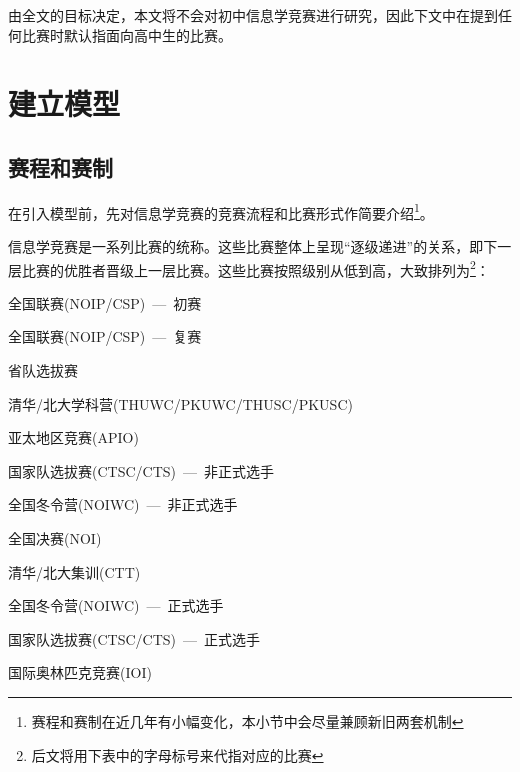     由全文的目标决定，本文将不会对初中信息学竞赛进行研究，因此下文中在提到任何比赛时默认指面向高中生的比赛。

\section{建立模型}\label{sec:sec2Modeling}

    \subsection{赛程和赛制}

        在引入模型前，先对信息学竞赛的竞赛流程和比赛形式作简要介绍\footnote{赛程和赛制在近几年有小幅变化，本小节中会尽量兼顾新旧两套机制}。

        信息学竞赛是一系列比赛的统称。这些比赛整体上呈现“逐级递进”的关系，即下一层比赛的优胜者晋级上一层比赛。这些比赛按照级别从低到高，大致排列为\footnote{后文将用下表中的字母标号来代指对应的比赛}：

        \begin{asparaenum}[a.]
            \begin{samepage}
            \item 全国联赛(NOIP/CSP)\ ---\ 初赛
            \nobreak
            \item 全国联赛(NOIP/CSP)\ ---\ 复赛
            \nobreak
            \item 省队选拔赛
            \end{samepage}
            \item 清华/北大学科营(THUWC/PKUWC/THUSC/PKUSC)
            \item 亚太地区竞赛(APIO)
            \item 国家队选拔赛(CTSC/CTS)\ ---\ 非正式选手
            \item 全国冬令营(NOIWC)\ ---\ 非正式选手
            \item 全国决赛(NOI)
            \item 清华/北大集训(CTT)
            \begin{samepage}
            \item 全国冬令营(NOIWC)\ ---\ 正式选手
            \nobreak
            \item 国家队选拔赛(CTSC/CTS)\ ---\ 正式选手
            \nobreak
            \item 国际奥林匹克竞赛(IOI)
            \end{samepage}
        \end{asparaenum}

